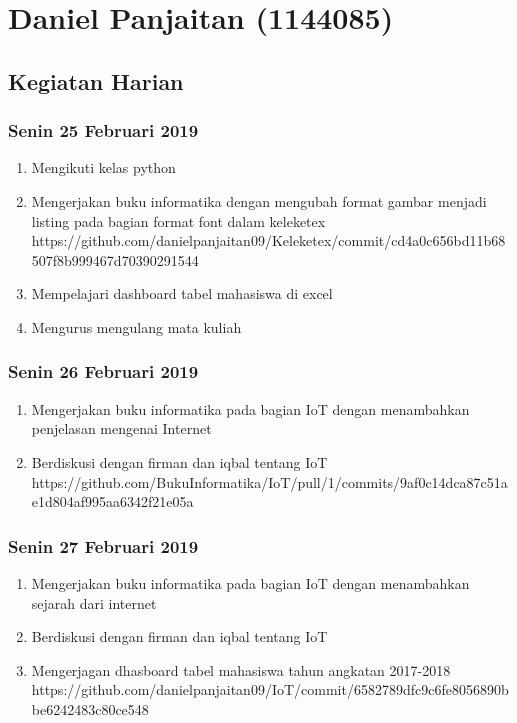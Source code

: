 \chapter{Daniel Panjaitan (1144085)}

\section{Kegiatan Harian}
\subsection{Senin 25 Februari 2019}
\begin{enumerate}
  \item Mengikuti kelas python
  \item Mengerjakan buku informatika dengan mengubah format gambar menjadi listing pada bagian format font dalam keleketex
  \subitem https://github.com/danielpanjaitan09/Keleketex/commit/cd4a0c656bd11b68507f8b999467d70390291544
  \item Mempelajari dashboard tabel mahasiswa di excel
  \item Mengurus mengulang mata kuliah
\end{enumerate}


\subsection{Senin 26 Februari 2019}
\begin{enumerate}
  \item Mengerjakan buku informatika pada bagian IoT dengan menambahkan penjelasan mengenai Internet
  \item Berdiskusi dengan firman dan iqbal tentang IoT
  \subitem https://github.com/BukuInformatika/IoT/pull/1/commits/9af0c14dca87c51ae1d804af995aa6342f21e05a
\end{enumerate} 

\subsection{Senin 27 Februari 2019}
\begin{enumerate}
  \item Mengerjakan buku informatika pada bagian IoT dengan menambahkan sejarah dari internet
  \item Berdiskusi dengan firman dan iqbal tentang IoT
  \item Mengerjagan dhasboard tabel mahasiswa tahun angkatan 2017-2018
  \subitem https://github.com/danielpanjaitan09/IoT/commit/6582789dfc9c6fe8056890bbe6242483c80ce548
\end{enumerate} 